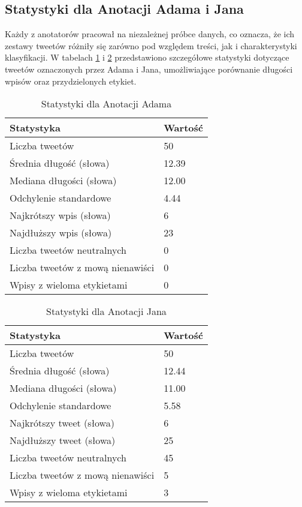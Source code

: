 \documentclass[12pt]{article}
\begin{document}
\subsection{Statystyki dla Anotacji Adama i Jana}

Każdy z anotatorów pracował na niezależnej próbce danych, co oznacza, że ich zestawy tweetów różniły się zarówno pod względem treści, jak i charakterystyki klasyfikacji. W tabelach \ref{tab:adam_stats} i \ref{tab:jan_stats} przedstawiono szczegółowe statystyki dotyczące tweetów oznaczonych przez Adama i Jana, umożliwiające porównanie długości wpisów oraz przydzielonych etykiet.

\begin{table}[h]
    \centering
    \caption{Statystyki dla Anotacji Adama}
    \label{tab:adam_stats}
    \begin{tabular}{|l|l|}
        \hline
        Statystyka & Wartość \\ \hline
        Liczba tweetów & 50 \\ \hline
        Średnia długość (słowa) & 12.39 \\ \hline
        Mediana długości (słowa) & 12.00 \\ \hline
        Odchylenie standardowe & 4.44 \\ \hline
        Najkrótszy wpis (słowa) & 6 \\ \hline
        Najdłuższy wpis (słowa) & 23 \\ \hline
        Liczba tweetów neutralnych & 0 \\ \hline
        Liczba tweetów z mową nienawiści & 0 \\ \hline
        Wpisy z wieloma etykietami & 0 \\ \hline
    \end{tabular}
\end{table}

\begin{table}[h]
    \centering
    \caption{Statystyki dla Anotacji Jana}
    \label{tab:jan_stats}
    \begin{tabular}{|l|l|}
        \hline
        Statystyka & Wartość \\ \hline
        Liczba tweetów & 50 \\ \hline
        Średnia długość (słowa) & 12.44 \\ \hline
        Mediana długości (słowa) & 11.00 \\ \hline
        Odchylenie standardowe & 5.58 \\ \hline
        Najkrótszy tweet (słowa) & 6 \\ \hline
        Najdłuższy tweet (słowa) & 25 \\ \hline
        Liczba tweetów neutralnych & 45 \\ \hline
        Liczba tweetów z mową nienawiści & 5 \\ \hline
        Wpisy z wieloma etykietami & 3 \\ \hline
    \end{tabular}
\end{table}
\end{document}
